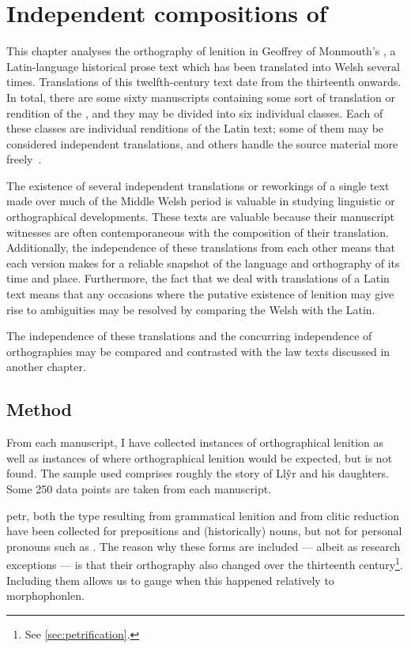 \chapter{Independent compositions of }
This chapter analyses the orthography of lenition in Geoffrey of Monmouth's , a Latin-language historical prose text which has been translated into Welsh several times.
Translations of this twelfth-century text date from the thirteenth onwards.
In total, there are some sixty manuscripts containing some sort of translation or rendition of the , and they may be divided into six individual classes.
Each of these classes are individual renditions of the Latin text; some of them may be considered independent translations, and others handle the source material more freely~\autocite[xxiv-xxxi]{roberts_brut_1971}.

The existence of several independent translations or reworkings of a single text made over much of the Middle Welsh period is valuable in studying linguistic or orthographical developments.
These texts are valuable because their manuscript witnesses are often contemporaneous with the composition of their translation. Additionally, the independence of these translations from each other means that each version makes for a reliable snapshot of the language and orthography of its time and place.
Furthermore, the fact that we deal with translations of a Latin text means that any occasions where the putative existence of lenition may give rise to ambiguities may be resolved by comparing the Welsh with the Latin. 

The independence of these translations and the concurring independence of orthographies may be compared and contrasted with the law texts discussed in another chapter.



\section{Method}
\label{sec:method}
From each manuscript, I have collected instances of orthographical
lenition as well as instances of where orthographical lenition would
be expected, but is not found. The sample used comprises roughly the
story of Llŷr and his daughters.  Some 250 data points are taken
from each manuscript.

\Gls{petr}, both the type resulting from grammatical lenition and from clitic reduction have been collected for prepositions
and (historically) nouns, but not for personal pronouns such
as . The reason why these forms are included --- albeit
as research exceptions --- is that their orthography also changed over the
thirteenth century\footnote{See \ref{sec:petrification}.}. Including them allows
us to gauge when this happened relatively to \gls{morphophonlen}.


